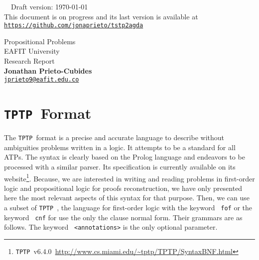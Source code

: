 \documentclass[11pt]{article}
\newcommand{\agda}[0]{\texttt{Agda}\,}
\newcommand{\tptp}[0]{\texorpdfstring{\texttt{TPTP}}\ \ }
\newcommand{\ttgray}[1]{\texttt{\color{gray} #1}}
\begin{document}

\hrulefill\ \ Draft version: \today\\
{\small
This document is on progress and its last version is available at
\href{https://github.com/jonaprieto/tstp2agda}{{\color{blue(munsell)}
\texttt{https://github.com/jonaprieto/tstp2agda}}}
}

\vspace{3mm}
\begin{center}
{\Large Propositional Problems}\\
{\large EAFIT University}\\[2.2mm]
Research Report\\
\textbf{Jonathan Prieto-Cubides}\\ %
\href{mailto:jprieto9@eafit.edu.co}{{\color{blue(munsell)}\texttt{jprieto9@eafit.edu.co}}}
\end{center}
\vspace{0.1 cm}



\section{\tptp Format}

The \tptp format is a precise and accurate language to describe without ambiguities problems written in a logic. It attempts to be a standard for all ATPs. The syntax is clearly based on the Prolog language and endeavors to be processed with a similar parser. Its specification is currently available on its website\footnote{\tptp v6.4.0~\url{http://www.cs.miami.edu/~tptp/TPTP/SyntaxBNF.html}}.
Because, we are interested in writing and reading problems in first-order logic and propositional logic for proofs reconstruction, we have only presented here the most relevant aspects of this syntax for that purpose. Then, we can use a subset of \tptp, the language for first-order logic with the keyword \ttgray{fof} or the keyword \ttgray{cnf} for use the only the clause normal form. Their grammars are as follows. The keyword \ttgray{<annotations>} is the only optional parameter.
\end{document}
